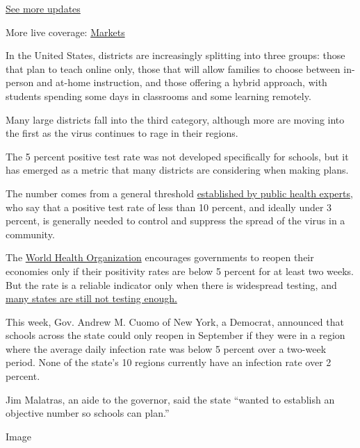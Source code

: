 \href{https://www.nytimes.com/2020/08/03/world/coronavirus-covid-19.html?action=click\&pgtype=Article\&state=default\&region=MAIN_CONTENT_1\&context=storylines_live_updates}{See
more updates}

More live coverage:
\href{https://www.nytimes.com/live/2020/08/03/business/stock-market-today-coronavirus?action=click\&pgtype=Article\&state=default\&region=MAIN_CONTENT_1\&context=storylines_live_updates}{Markets}

In the United States, districts are increasingly splitting into three
groups: those that plan to teach online only, those that will allow
families to choose between in-person and at-home instruction, and those
offering a hybrid approach, with students spending some days in
classrooms and some learning remotely.

Many large districts fall into the third category, although more are
moving into the first as the virus continues to rage in their regions.

The 5 percent positive test rate was not developed specifically for
schools, but it has emerged as a metric that many districts are
considering when making plans.

The number comes from a general threshold
\href{https://globalepidemics.org/wp-content/uploads/2020/06/key_metrics_and_indicators_v4.pdf}{established
by public health experts}, who say that a positive test rate of less
than 10 percent, and ideally under 3 percent, is generally needed to
control and suppress the spread of the virus in a community.

The \href{https://coronavirus.jhu.edu/testing/testing-positivity}{World
Health Organization} encourages governments to reopen their economies
only if their positivity rates are below 5 percent for at least two
weeks. But the rate is a reliable indicator only when there is
widespread testing, and
\href{https://www.nytimes.com/interactive/2020/us/coronavirus-testing.html}{many
states are still not testing enough.}

This week, Gov. Andrew M. Cuomo of New York, a Democrat, announced that
schools across the state could only reopen in September if they were in
a region where the average daily infection rate was below 5 percent over
a two-week period. None of the state's 10 regions currently have an
infection rate over 2 percent.

Jim Malatras, an aide to the governor, said the state ``wanted to
establish an objective number so schools can plan.''

Image

